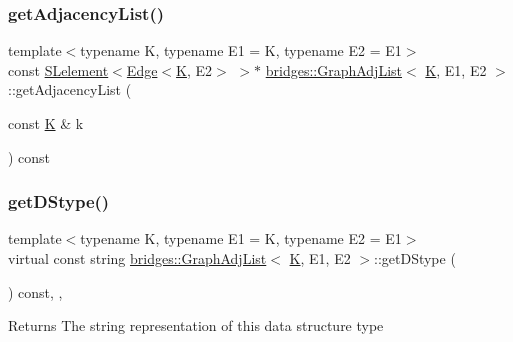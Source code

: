 \subsubsection{\texorpdfstring{getAdjacencyList()}{getAdjacencyList()}\hspace{0.1cm}{\footnotesize\ttfamily [3/3]}}
{\footnotesize\ttfamily template$<$typename K, typename E1 = K, typename E2 = E1$>$ \\
const \mbox{\hyperlink{classbridges_1_1_s_lelement}{S\+Lelement}}$<$\mbox{\hyperlink{classbridges_1_1_edge}{Edge}}$<$\mbox{\hyperlink{namespacebridges_acfb0a4f7877d8f63de3e6862004c50edaa5f3c6a11b03839d46af9fb43c97c188}{K}}, E2$>$ $>$$\ast$ \mbox{\hyperlink{classbridges_1_1_graph_adj_list}{bridges\+::\+Graph\+Adj\+List}}$<$ \mbox{\hyperlink{namespacebridges_acfb0a4f7877d8f63de3e6862004c50edaa5f3c6a11b03839d46af9fb43c97c188}{K}}, E1, E2 $>$\+::get\+Adjacency\+List (\begin{DoxyParamCaption}\item[{const \mbox{\hyperlink{namespacebridges_acfb0a4f7877d8f63de3e6862004c50edaa5f3c6a11b03839d46af9fb43c97c188}{K}} \&}]{k }\end{DoxyParamCaption}) const\hspace{0.3cm}{\ttfamily [inline]}}

\mbox{\label{classbridges_1_1_graph_adj_list_ab1aeeed39ac0e0f66a677e7b0e722030}} 
\subsubsection{\texorpdfstring{getDStype()}{getDStype()}}
{\footnotesize\ttfamily template$<$typename K, typename E1 = K, typename E2 = E1$>$ \\
virtual const string \mbox{\hyperlink{classbridges_1_1_graph_adj_list}{bridges\+::\+Graph\+Adj\+List}}$<$ \mbox{\hyperlink{namespacebridges_acfb0a4f7877d8f63de3e6862004c50edaa5f3c6a11b03839d46af9fb43c97c188}{K}}, E1, E2 $>$\+::get\+D\+Stype (\begin{DoxyParamCaption}{ }\end{DoxyParamCaption}) const\hspace{0.3cm}{\ttfamily [inline]}, {\ttfamily [override]}, {\ttfamily [virtual]}}

\begin{DoxyReturn}{Returns}
The string representation of this data structure type 
\end{DoxyReturn}


